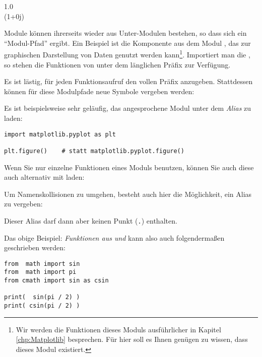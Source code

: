\begin{cmdbox}[Ausgabe]
1.0 \\
(1+0j)
\end{cmdbox}

Module können ihrerseits wieder aus Unter-Modulen bestehen, so dass sich ein \enquote{Modul-Pfad} ergibt. Ein Beispiel ist die Komponente  aus dem Modul , das zur graphischen Darstellung von Daten genutzt werden kann\footnote{Wir werden die Funktionen dieses Moduls ausführlicher in Kapitel \ref{chp:Matplotlib} besprechen. Für hier soll es Ihnen genügen zu wissen, dass dieses Modul existiert.}. Importiert man die , so stehen die Funktionen von  unter dem länglichen Präfix  zur Verfügung.

Es ist lästig, für jeden Funktionsaufruf den vollen Präfix  anzugeben. Stattdessen können für diese Modulpfade neue Symbole vergeben werden:

\begin{codebox}[Syntax]
\end{codebox}

Es ist beispielsweise sehr geläufig, das angesprochene Modul  unter dem \emph{Alias}  zu laden:
\begin{codebox}
\begin{verbatim}
import matplotlib.pyplot as plt

plt.figure()    # statt matplotlib.pyplot.figure()
\end{verbatim}
\end{codebox}

Wenn Sie nur einzelne Funktionen eines Moduls benutzen, können Sie auch diese auch alternativ mit  laden:
\begin{codebox}[Syntax]
\end{codebox}

Um Namenskollisionen zu umgehen, besteht auch hier die Möglichkeit, ein Alias zu vergeben:
\begin{codebox}[Syntax]
\end{codebox}
Dieser Alias darf dann aber keinen Punkt (\texttt{.}) enthalten.

Das obige Beispiel: \emph{Funktionen aus  und } kann also auch folgendermaßen geschrieben werden:
\begin{codebox}
\begin{verbatim}
from  math import sin
from  math import pi
from cmath import sin as csin

print(  sin(pi / 2) )
print( csin(pi / 2) )
\end{verbatim}
\end{codebox}

